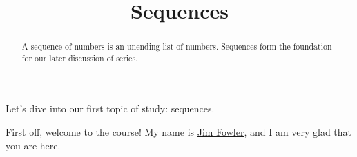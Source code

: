 \documentclass{ximera}
\title{Sequences}
\begin{document}
\begin{abstract}
  A sequence of numbers is an unending list of numbers.  Sequences form the foundation for our later discussion of series.
\end{abstract}

\maketitle

Let's dive into our first topic of study: sequences.

First off, welcome to the course!  My name is \href{http://kisonecat.com/}{Jim Fowler}, and I am very glad that you are here.











\end{document}
